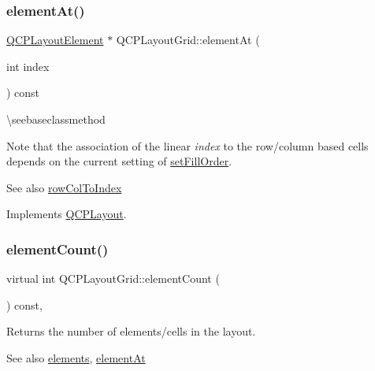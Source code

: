 \subsubsection{\texorpdfstring{elementAt()}{elementAt()}}
{\footnotesize\ttfamily \mbox{\hyperlink{class_q_c_p_layout_element}{Q\+C\+P\+Layout\+Element}} $\ast$ Q\+C\+P\+Layout\+Grid\+::element\+At (\begin{DoxyParamCaption}\item[{int}]{index }\end{DoxyParamCaption}) const\hspace{0.3cm}{\ttfamily [virtual]}}

\textbackslash{}seebaseclassmethod

Note that the association of the linear {\itshape index} to the row/column based cells depends on the current setting of \mbox{\hyperlink{class_q_c_p_layout_grid_affc2f3cfd22f28698c5b29b960d2a391}{set\+Fill\+Order}}.

\begin{DoxySeeAlso}{See also}
\mbox{\hyperlink{class_q_c_p_layout_grid_a682ba76f130810ffd294032a1bfbcfcb}{row\+Col\+To\+Index}} 
\end{DoxySeeAlso}


Implements \mbox{\hyperlink{class_q_c_p_layout_afa73ca7d859f8a3ee5c73c9b353d2a56}{Q\+C\+P\+Layout}}.

\mbox{\label{class_q_c_p_layout_grid_a9a8942aface780a02445ebcf14c48513}} 
\subsubsection{\texorpdfstring{elementCount()}{elementCount()}}
{\footnotesize\ttfamily virtual int Q\+C\+P\+Layout\+Grid\+::element\+Count (\begin{DoxyParamCaption}{ }\end{DoxyParamCaption}) const\hspace{0.3cm}{\ttfamily [inline]}, {\ttfamily [virtual]}}

Returns the number of elements/cells in the layout.

\begin{DoxySeeAlso}{See also}
\mbox{\hyperlink{class_q_c_p_layout_grid_a7d5b968b4cf57393e9e387976d91f8f7}{elements}}, \mbox{\hyperlink{class_q_c_p_layout_grid_a4288f174082555f6bd92021bdedb75dc}{element\+At}} 
\end{DoxySeeAlso}


